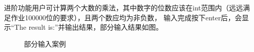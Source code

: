\documentclass[a4paper, 11pt, UTF8]{ctexart}
\begin{document}
进阶功能用户可计算两个大数的乘法，其中数字的位数应该在int范围内（远远满足作业100000位的要求），且两个数应均为非负数，
输入完成按下enter后，会显示“The result is:”并输出结果，部分输入结果如图。

\begin{figure}[H]
    \centering
    \quad
    \quad
    \caption{部分输入案例}
\end{figure}
\end{document}
